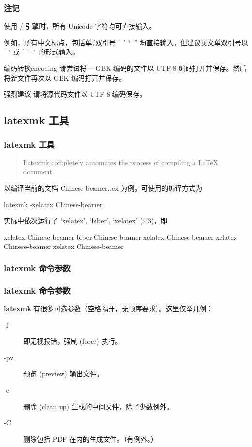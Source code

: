 \documentclass[final,aspectratio=32]{ctexbeamer}
\begin{document}
\begin{frame}[fragile]
\frametitle{注记}
使用 / 引擎时，所有 Unicode 字符均可直接输入。

例如，所有中文标点，包括单/双引号 ‘\, ’ “\, ” 均直接输入。但建议英文单双引号以 \verb|`'| 或 \verb|``''| 的形式输入。

\begin{Ex}{编码转换}{encoding}
请尝试将一 GBK 编码的文件以 UTF-8 编码打开并保存。然后将新文件再次以 GBK 编码打开并保存。
\end{Ex}
\begin{alertblock}{强烈建议}
请将源代码文件以 UTF-8 编码保存。
\end{alertblock}
\end{frame}


\subsection{latexmk 工具}\label{ap:latexmk}
\begin{frame}[fragile]
\frametitle{latexmk 工具}
\begin{quote}
Latexmk completely automates the process of compiling a LaTeX document.
\end{quote}
以编译当前的文档 Chinese-beamer.tex 为例。可使用的编译方式为
\begin{bashlst}
latexmk -xelatex Chinese-beamer
\end{bashlst}
实际中依次运行了 `xelatex', `biber', `xelatex' ($\times 3$)，即
\begin{bashlst}[numbers=left]
xelatex Chinese-beamer
biber Chinese-beamer
xelatex Chinese-beamer
xelatex Chinese-beamer
xelatex Chinese-beamer
\end{bashlst}
\end{frame}

\subsubsection{latexmk 命令参数}
\begin{frame}
\frametitle[命令参数]{latexmk 命令参数}
\textbf{latexmk} 有很多可选参数（空格隔开，无顺序要求）。这里仅举几例：
\begin{description}
\item[-f] 即无视报错，强制 (force) 执行。
\item[-pv] 预览 (preview) 输出文件。
\item[-c] 删除 (clean up) 生成的中间文件，除了少数例外。
\item[-C] 删除包括 PDF 在内的生成文件。（有例外。）
\end{description}
\end{frame}
\end{document}
